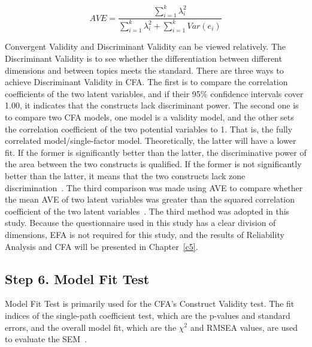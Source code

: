 \begin{equation}
\label{for5}
AVE = \frac{\sum_{i=1}^{k} \lambda_i^2 }{\sum_{i=1}^{k} \lambda_i^2+\sum_{i=1}^{k} Var(e_i)}
\end{equation}

Convergent Validity and Discriminant Validity can be viewed relatively. The Discriminant Validity is to see whether the differentiation between different dimensions and between topics meets the standard. There are three ways to achieve Discriminant Validity in CFA. The first is to compare the correlation coefficients of the two latent variables, and if their 95\% confidence intervals cover 1.00, it indicates that the constructs lack discriminant power. The second one is to compare two CFA models, one model is a validity model, and the other sets the correlation coefficient of the two potential variables to 1. That is, the fully correlated model/single-factor model. Theoretically, the latter will have a lower fit. If the former is significantly better than the latter, the discriminative power of the area between the two constructs is qualified. If the former is not significantly better than the latter, it means that the two constructs lack zone discrimination~\cite{ref34,ref35}. The third comparison was made using AVE to compare whether the mean AVE of two latent variables was greater than the squared correlation coefficient of the two latent variables~\cite{ref31}. The third method was adopted in this study. Because the questionnaire used in this study has a clear division of dimensions, EFA is not required for this study, and the results of Reliability Analysis and CFA will be presented in Chapter~\ref{c5}.


\subsection{Step 6. Model Fit Test}
\label{step6}
Model Fit Test is primarily used for the CFA's Construct Validity test. The fit indices of the single-path coefficient test, which are the p-values and standard errors, and the overall model fit, which are the $\chi^2$ and RMSEA values, are used to evaluate the SEM~\cite{ref16}.

